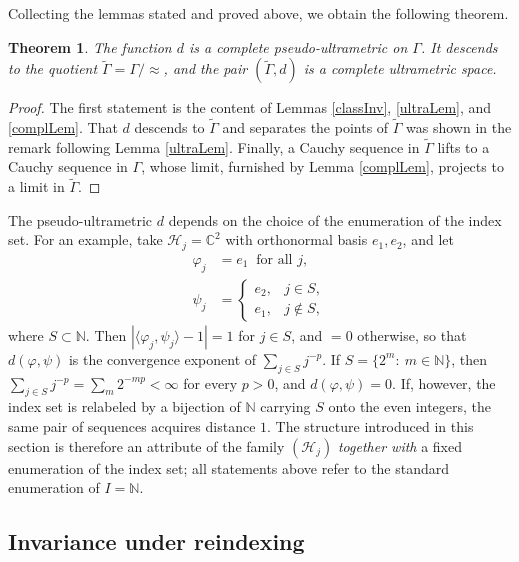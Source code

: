 \documentclass[twoside,11pt,letter]{article}
\def\bC{\mathbb{C}}
\def\bN{\mathbb{N}}
\def\cH{{\mathcal{H}}}
\newtheorem{theorem}{Theorem}[section]
\theoremstyle{definition}
\theoremstyle{definition}
\theoremstyle{plain}
\newenvironment{remark}[1][Remark.]{\begin{trivlist}
\item[\hskip \labelsep {\bfseries #1}]}{\end{trivlist}}
\begin{document}
Collecting the lemmas stated and proved above, we obtain the following theorem.
\begin{theorem}\label{mainThm}
The function $d$ is a complete pseudo-ultrametric on $\Gamma$. It descends to the quotient $\widetilde\Gamma=\Gamma/\!\approx$, and the pair $(\widetilde\Gamma,d)$ is a complete ultrametric space.
\end{theorem}
\begin{proof}
The first statement is the content of Lemmas \ref{classInv}, \ref{ultraLem}, and \ref{complLem}. That $d$ descends to $\widetilde\Gamma$ and separates the points of $\widetilde\Gamma$ was shown in the remark following Lemma \ref{ultraLem}. Finally, a Cauchy sequence in $\widetilde\Gamma$ lifts to a Cauchy sequence in $\Gamma$, whose limit, furnished by Lemma \ref{complLem}, projects to a limit in $\widetilde\Gamma$.
\end{proof}

\begin{remark}
The pseudo-ultrametric $d$ depends on the choice of the enumeration of the index set. For an example, take $\cH_j=\bC^2$ with orthonormal basis $e_1,e_2$, and let
\begin{equation*}
\begin{split}
\varphi_j&=e_1\ \text{ for all }j,\\
\psi_j&=
\begin{cases}
e_2, & j\in S,\\
e_1, & j\notin S,
\end{cases}
\end{split}
\end{equation*}
where $S\subset\bN$. Then $|\langle\varphi_j,\psi_j\rangle-1|=1$ for $j\in S$, and $=0$ otherwise, so that $d(\varphi,\psi)$ is the convergence exponent of $\sum_{j\in S}j^{-p}$. If $S=\{2^m:\:m\in\bN\}$, then $\sum_{j\in S}j^{-p}=\sum_m 2^{-mp}<\infty$ for every $p>0$, and $d(\varphi,\psi)=0$. If, however, the index set is relabeled by a bijection of $\bN$ carrying $S$ onto the even integers, the same pair of sequences acquires distance $1$. The structure introduced in this section is therefore an attribute of the family $(\cH_j)$ \emph{together with} a fixed enumeration of the index set; all statements above refer to the standard enumeration of $I=\bN$.
\end{remark}

\subsection{Invariance under reindexing}
\end{document}
